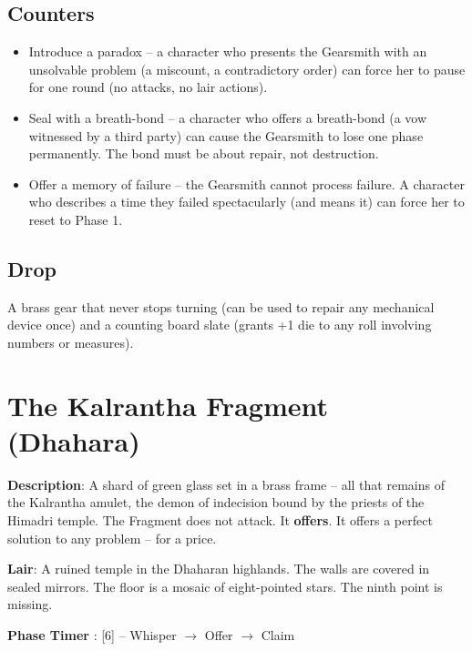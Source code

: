 \subsection*{Counters}

\begin{itemize}
    \item Introduce a paradox -- a character who presents the Gearsmith with an unsolvable problem (a miscount, a contradictory order) can force her to pause for one round (no attacks, no lair actions).
    \item Seal with a breath-bond -- a character who offers a breath-bond (a vow witnessed by a third party) can cause the Gearsmith to lose one phase permanently. The bond must be about repair, not destruction.
    \item Offer a memory of failure -- the Gearsmith cannot process failure. A character who describes a time they failed spectacularly (and means it) can force her to reset to Phase 1.
\end{itemize}

\subsection*{Drop}
\noindent A brass gear that never stops turning (can be used to repair any mechanical device once) and a counting board slate (grants +1 die to any roll involving numbers or measures).


\section*{The Kalrantha Fragment (Dhahara)}

\noindent\textbf{Description}: A shard of green glass set in a brass frame -- all that remains of the Kalrantha amulet, the demon of indecision bound by the priests of the Himadri temple. The Fragment does not attack. It \textbf{offers}. It offers a perfect solution to any problem -- for a price.

\noindent\textbf{Lair}: A ruined temple in the Dhaharan highlands. The walls are covered in sealed mirrors. The floor is a mosaic of eight-pointed stars. The ninth point is missing.

\noindent\textbf{Phase Timer }: [6] -- Whisper $\rightarrow$ Offer $\rightarrow$ Claim

